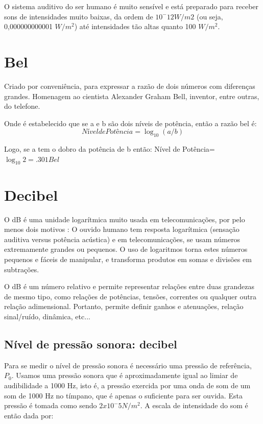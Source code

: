 \documentclass[
	article,			%
	11pt,				%
	oneside,			%
	a4paper,			%
	english,			%
	brazil,				%
	sumario=tradicional
	]{abntex2}
\begin{document}
O sistema auditivo do ser humano é muito sensível
e está preparado para receber sons de intensidades
muito baixas, da ordem de $10^-12 W/m2$ (ou seja,
0,000000000001 $W/m^2$) até intensidades tão altas
quanto 100 $W/m^2$.

\section{Bel}
Criado por conveniência, para expressar a razão de dois números com diferenças grandes. Homenagem ao cientista Alexander Graham Bell, inventor, entre outras, do telefone.

Onde é estabelecido que se a e b são dois níveis de potência, então a razão bel é: 
$$Nível de Potência = \log_{10} (a/b)$$

Logo, se a tem o dobro da potência de b então:
Nível de Potência= $\log_{10} 2 = .301 Bel$

\section{Decibel}

O dB é uma unidade logarítmica muito usada em telecomunicações, por pelo menos dois motivos : O ouvido humano tem resposta logarítmica (sensação auditiva versus potência acústica) e em telecomunicações, se usam números extremamente grandes ou pequenos. O uso de logaritmos torna estes números pequenos e fáceis de manipular, e transforma produtos em somas e divisões em subtrações.

O dB é um número relativo e permite representar relações entre duas grandezas de mesmo tipo, como relações de potências, tensões, correntes ou qualquer outra relação adimensional.
Portanto, permite definir ganhos e atenuações, relação sinal/ruído, dinâmica, etc...


\subsection{Nível de pressão sonora: decibel}

Para se medir o nível de pressão sonora é necessário uma pressão de referência, $P_0$. Usamos uma pressão sonora que é aproximadamente igual ao limiar de audibilidade a 1000 Hz, isto é, a pressão exercida por uma onda de som de um som de 1000 Hz no tímpano, que é apenas o suficiente para ser ouvida. Esta pressão é tomada como sendo $2 x 10^-5 N/m^2$. A escala de intensidade do som é então dada por:
\end{document}
